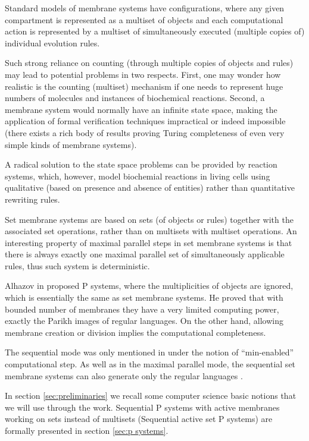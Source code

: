 \documentclass[submission,copyright,creativecommons]{../lib/lncs/llncs}
\begin{document}
Standard models of membrane systems have configurations, where any given compartment is represented as a multiset of objects and each computational action is represented by a multiset of simultaneously executed (multiple copies of) individual evolution rules.

Such strong reliance on counting (through multiple copies of objects and rules) may lead to potential problems in two respects. First, one may wonder how realistic is the counting (multiset) mechanism if one needs to represent huge numbers of molecules and instances of biochemical reactions. Second, a membrane system would normally have an infinite state space, making the application
of formal verification techniques impractical or indeed impossible (there exists a rich body of results proving Turing completeness of even very simple kinds of membrane systems).

A radical solution to the state space problems can be provided by reaction systems, which, however, model biochemial reactions in living cells using qualitative (based on presence and absence of entities) rather than quantitative rewriting rules.

Set membrane systems \cite{Kleijn11SetMembrane} are based on sets (of objects or rules) together with the associated set operations, rather than on multisets with multiset operations. An interesting property of maximal parallel steps in set membrane systems is that there is always exactly one maximal parallel set of simultaneously applicable rules, thus such system is deterministic.

Alhazov in \cite{Alhazov05WithoutMultiplicities} proposed P systems, where the multiplicities of objects are ignored, which is essentially the same as set membrane systems. He proved that with bounded number of membranes they have a very limited computing power, exactly the Parikh images of regular languages. On the other hand, allowing membrane creation or division implies the computational completeness.

The sequential mode was only mentioned in \cite{Kleijn11SetMembrane} under the notion of ``min-enabled'' computational step. As well as in the maximal parallel mode, the sequential set membrane systems can also generate only the regular languages \cite{Alhazov05WithoutMultiplicities}.

In section \ref{sec:preliminaries} we recall some computer science basic notions that we will use through the work. Sequential P systems with active membranes working on sets instead of multisets (Sequential active set P systems) are formally presented in section \ref{sec:p systems}.
\end{document}
